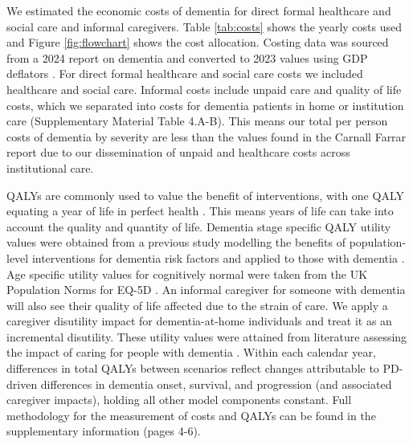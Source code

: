 \documentclass[11pt,a4paper]{article}
\begin{document}
We estimated the economic costs of dementia for direct formal healthcare and social care and informal caregivers. Table \ref{tab:costs} shows the yearly costs used and Figure \ref{fig:flowchart} shows the cost allocation. Costing data was sourced from a 2024 report on dementia and converted to 2023 values using GDP deflators \cite{ref34,ref35}. For direct formal healthcare and social care costs we included healthcare and social care. Informal costs include unpaid care and quality of life costs, which we separated into costs for dementia patients in home or institution care (Supplementary Material Table 4.A-B). This means our total per person costs of dementia by severity are less than the values found in the Carnall Farrar report due to our dissemination of unpaid and healthcare costs across institutional care.

QALYs are commonly used to value the benefit of interventions, with one QALY equating a year of life in perfect health \cite{ref36}. This means years of life can take into account the quality and quantity of life. Dementia stage specific QALY utility values were obtained from a previous study modelling the benefits of population-level interventions for dementia risk factors and applied to those with dementia \cite{ref37}. Age specific utility values for cognitively normal were taken from the UK Population Norms for EQ-5D \cite{ref38}. An informal caregiver for someone with dementia will also see their quality of life affected due to the strain of care. We apply a caregiver disutility impact for dementia-at-home individuals and treat it as an incremental disutility. These utility values were attained from literature assessing the impact of caring for people with dementia \cite{ref39}. Within each calendar year, differences in total QALYs between scenarios reflect changes attributable to PD-driven differences in dementia onset, survival, and progression (and associated caregiver impacts), holding all other model components constant. Full methodology for the measurement of costs and QALYs can be found in the supplementary information (pages 4-6).
\end{document}
